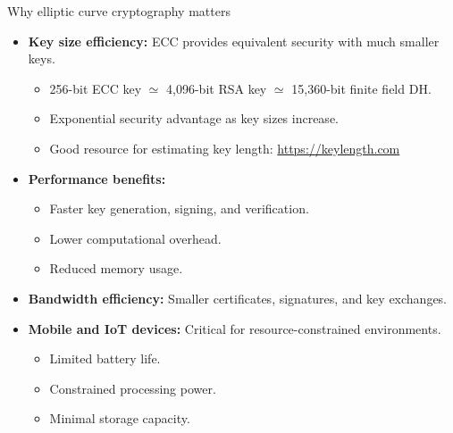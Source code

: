 \documentclass[aspectratio=169, lualatex, handout]{beamer}
\begin{document}
\begin{frame}{Why elliptic curve cryptography matters}
	\begin{itemize}
		\item \textbf{Key size efficiency:} ECC provides equivalent security with much smaller keys.
		      \begin{itemize}
			      \item 256-bit ECC key $\simeq$ 4,096-bit RSA key $\simeq$ 15,360-bit finite field DH.
			      \item Exponential security advantage as key sizes increase.
			      \item Good resource for estimating key length: \url{https://keylength.com}
		      \end{itemize}
		\item \textbf{Performance benefits:}
		      \begin{itemize}
			      \item Faster key generation, signing, and verification.
			      \item Lower computational overhead.
			      \item Reduced memory usage.
		      \end{itemize}
		\item \textbf{Bandwidth efficiency:} Smaller certificates, signatures, and key exchanges.
		\item \textbf{Mobile and IoT devices:} Critical for resource-constrained environments.
		      \begin{itemize}
			      \item Limited battery life.
			      \item Constrained processing power.
			      \item Minimal storage capacity.
		      \end{itemize}
	\end{itemize}
\end{frame}
\end{document}
